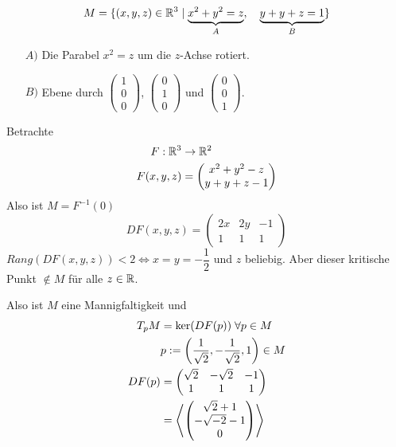 \documentclass[main.tex]{subfiles}
\begin{document}
\begin{Beispiel}
  $$M = \{(x,y,z) \in \mathbb{R}^3 \mid \underbrace{x^2 + y^2 = z}_{A} ,\quad \underbrace{y+y+z = 1}_{B}\}$$
  \begin{itemize}
    \item[$A)$] Die Parabel $x^2 = z$ um die $z$-Achse rotiert.
    \item[$B)$] Ebene durch $\left(\begin{smallmatrix} 1 \\ 0 \\ 0 \end{smallmatrix}\right)$, $\left(\begin{smallmatrix} 0 \\ 1 \\ 0 \end{smallmatrix}\right)$ und $\left(\begin{smallmatrix} 0 \\ 0 \\ 1 \end{smallmatrix}\right)$.
  \end{itemize}
  Betrachte
  $$\begin{aligned}
    F: \mathbb{R}^3 & \to \mathbb{R}^2 \\
    F(x,y,z) & = \begin{pmatrix}
      x^2 + y^2 - z\\
      y + y +z -1
    \end{pmatrix}
  \end{aligned}$$
  Also ist $M = F^{-1}(0)$
  $$DF(x,y,z) = \begin{pmatrix}
    2x & 2y & -1 \\
    1 & 1 & 1
  \end{pmatrix}$$
  $Rang(DF(x,y,z)) < 2 \Leftrightarrow x = y = -\dfrac{1}{2}$ und $z$ beliebig. Aber dieser kritische Punkt $\notin M$ für alle $z \in \mathbb{R}$.

  Also ist $M$ eine Mannigfaltigkeit und
  $$\begin{aligned}
    T_p M & = \ker( DF(p)) \;\forall p \in M \\
    & p := \left(\frac{1}{\sqrt{2}},-\frac{1}{\sqrt{2}},1 \right) \in M \\
    DF(p) & = \begin{pmatrix}
      \sqrt{2} & - \sqrt{2} & -1 \\
      1  & 1 & 1
    \end{pmatrix} \\
    & = \left< \begin{pmatrix}
      \sqrt{2} + 1 \\
      -\sqrt{-2} - 1 \\
      0
    \end{pmatrix}\right>
  \end{aligned}$$
\end{Beispiel}
\end{document}
